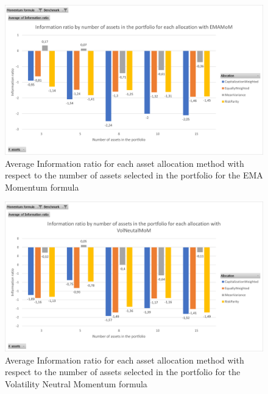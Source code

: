 \documentclass{article}
\begin{document}
\begin{figure}[H] %
    \centering
    \includegraphics[width=0.75\linewidth]{relative_management/Information ratio_EMAMoM_BenchBTC.png}
    \caption{Average Information ratio for each asset allocation method with respect to the number of assets selected in the portfolio for the EMA Momentum formula}
    \label{fig:info ratio EMAMOM}
\end{figure}

\begin{figure}[H] %
    \centering
    \includegraphics[width=0.75\linewidth]{relative_management/Information ratio VolNeutalMoM_BenchBTC.png}
    \caption{Average Information ratio for each asset allocation method with respect to the number of assets selected in the portfolio for the Volatility Neutral Momentum formula}
    \label{fig:info ratio VolNeutMOM}
\end{figure}
\end{document}
